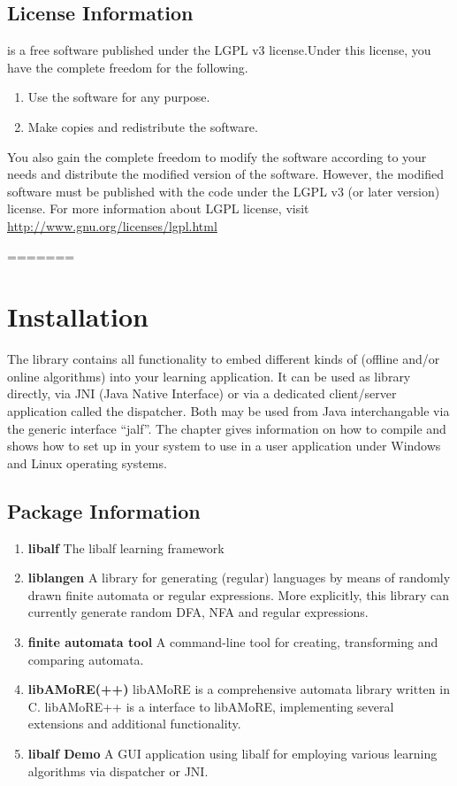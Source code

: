 \section{License Information}
\libalf is a free software published under the LGPL v3 license.Under this license, you have the complete freedom for the following.
\begin{enumerate}
 \item Use the software for any purpose.
 \item Make copies and redistribute the software.
\end{enumerate}
You also gain the complete freedom to modify the software according to your needs and distribute the modified version of the software. However, the modified software must be published with the code under the LGPL v3 (or later version) license. 
For more information about LGPL license, visit \url{http://www.gnu.org/licenses/lgpl.html}



=======

\chapter{Installation}
The \libalf library contains all functionality to embed different kinds of (offline and/or online algorithms) into your learning application. It can be used as \cpp library directly, via JNI (Java Native Interface) or via a dedicated client/server application called the dispatcher. Both may be used from Java interchangable via the generic interface ``jalf''.
The chapter gives information on how to compile \libalf and shows how to set up \libalf in your system to use in a user application under Windows and Linux operating systems.

\section{Package Information}
\begin{enumerate}
 \item \textbf{libalf}
	The libalf learning framework
 \item \textbf{liblangen}
	A \cpp library for generating (regular) languages by means of randomly drawn finite automata or regular expressions. More explicitly, this library can currently generate random DFA, NFA and regular expressions.
 \item \textbf{finite automata tool}
	A command-line tool for creating, transforming and comparing automata.
 \item \textbf{libAMoRE(++)}
 	libAMoRE is a comprehensive automata library written in C. libAMoRE++ is a \cpp interface to libAMoRE, implementing several extensions and additional functionality.
 \item \textbf{libalf Demo}
 	A GUI application using libalf for employing various learning algorithms via dispatcher or JNI.
\end{enumerate}

